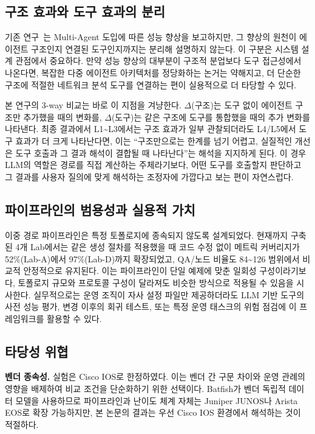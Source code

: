 \documentclass[journal]{IEEEtran}
\begin{document}
\subsection{구조 효과와 도구 효과의 분리}
기존 연구~\cite{ref14, ref15}는 Multi-Agent 도입에 따른 성능 향상을 보고하지만, 그 향상의 원천이 에이전트 구조인지 연결된 도구인지까지는 분리해 설명하지 않는다. 이 구분은 시스템 설계 관점에서 중요하다. 만약 성능 향상의 대부분이 구조적 분업보다 도구 접근성에서 나온다면, 복잡한 다중 에이전트 아키텍처를 정당화하는 논거는 약해지고, 더 단순한 구조에 적절한 네트워크 분석 도구를 연결하는 편이 실용적으로 더 타당할 수 있다.

본 연구의 3-way 비교는 바로 이 지점을 겨냥한다. $\Delta$(구조)는 도구 없이 에이전트 구조만 추가했을 때의 변화를, $\Delta$(도구)는 같은 구조에 도구를 통합했을 때의 추가 변화를 나타낸다. 최종 결과에서 L1\textasciitilde L3에서는 구조 효과가 일부 관찰되더라도 L4/L5에서 도구 효과가 더 크게 나타난다면, 이는 ``구조만으로는 한계를 넘기 어렵고, 실질적인 개선은 도구 호출과 그 결과 해석이 결합될 때 나타난다''는 해석을 지지하게 된다. 이 경우 LLM의 역할은 경로를 직접 계산하는 주체라기보다, 어떤 도구를 호출할지 판단하고 그 결과를 사용자 질의에 맞게 해석하는 조정자에 가깝다고 보는 편이 자연스럽다.

\subsection{파이프라인의 범용성과 실용적 가치}
이중 경로 파이프라인은 특정 토폴로지에 종속되지 않도록 설계되었다. 현재까지 구축된 4개 Lab에서는 같은 생성 절차를 적용했을 때 코드 수정 없이 메트릭 커버리지가 52\%(Lab-A)에서 97\%(Lab-D)까지 확장되었고, QA/노드 비율도 84\textasciitilde126 범위에서 비교적 안정적으로 유지된다. 이는 파이프라인이 단일 예제에 맞춘 일회성 구성이라기보다, 토폴로지 규모와 프로토콜 구성이 달라져도 비슷한 방식으로 적용될 수 있음을 시사한다. 실무적으로는 운영 조직이 자사 설정 파일만 제공하더라도 LLM 기반 도구의 사전 성능 평가, 변경 이후의 회귀 테스트, 또는 특정 운영 태스크의 위험 점검에 이 프레임워크를 활용할 수 있다.

\subsection{타당성 위협}
\textbf{벤더 종속성.} 실험은 Cisco IOS로 한정하였다. 이는 벤더 간 구문 차이와 운영 관례의 영향을 배제하여 비교 조건을 단순화하기 위한 선택이다. Batfish가 벤더 독립적 데이터 모델을 사용하므로 파이프라인과 난이도 체계 자체는 Juniper JUNOS나 Arista EOS로 확장 가능하지만, 본 논문의 결과는 우선 Cisco IOS 환경에서 해석하는 것이 적절하다.
\end{document}
